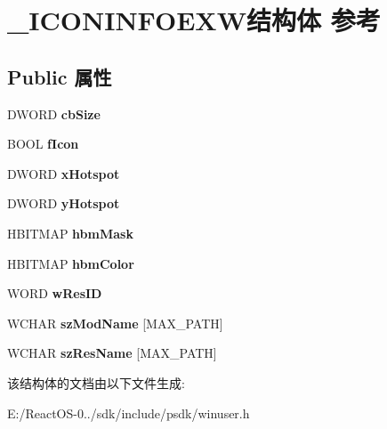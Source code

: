 \hypertarget{struct___i_c_o_n_i_n_f_o_e_x_w}{}\section{\+\_\+\+I\+C\+O\+N\+I\+N\+F\+O\+E\+X\+W结构体 参考}
\label{struct___i_c_o_n_i_n_f_o_e_x_w}
\subsection*{Public 属性}
\begin{DoxyCompactItemize}
\item 
\mbox{\label{struct___i_c_o_n_i_n_f_o_e_x_w_a4202eb53e8642f770f4d5baed3032496}} 
D\+W\+O\+RD {\bfseries cb\+Size}
\item 
\mbox{\label{struct___i_c_o_n_i_n_f_o_e_x_w_aa5603665c8ac4af2f0b5709dab7af674}} 
B\+O\+OL {\bfseries f\+Icon}
\item 
\mbox{\label{struct___i_c_o_n_i_n_f_o_e_x_w_a0a91b12b072897011c8b254a799de62e}} 
D\+W\+O\+RD {\bfseries x\+Hotspot}
\item 
\mbox{\label{struct___i_c_o_n_i_n_f_o_e_x_w_a934b4baf2380f6187fb4c9151dc472a1}} 
D\+W\+O\+RD {\bfseries y\+Hotspot}
\item 
\mbox{\label{struct___i_c_o_n_i_n_f_o_e_x_w_af23cc4a08c0e92194b45869b10efebe0}} 
H\+B\+I\+T\+M\+AP {\bfseries hbm\+Mask}
\item 
\mbox{\label{struct___i_c_o_n_i_n_f_o_e_x_w_ab54eccf143e8f97ec9a04a3325bc34c1}} 
H\+B\+I\+T\+M\+AP {\bfseries hbm\+Color}
\item 
\mbox{\label{struct___i_c_o_n_i_n_f_o_e_x_w_a6816db7be9a7fe0073675b38bbaebf98}} 
W\+O\+RD {\bfseries w\+Res\+ID}
\item 
\mbox{\label{struct___i_c_o_n_i_n_f_o_e_x_w_a4bdc512a82c7f86c961d9cb669addaba}} 
W\+C\+H\+AR {\bfseries sz\+Mod\+Name} \mbox{[}M\+A\+X\+\_\+\+P\+A\+TH\mbox{]}
\item 
\mbox{\label{struct___i_c_o_n_i_n_f_o_e_x_w_aeb21c8d130070e9e4d4b1af8624f7054}} 
W\+C\+H\+AR {\bfseries sz\+Res\+Name} \mbox{[}M\+A\+X\+\_\+\+P\+A\+TH\mbox{]}
\end{DoxyCompactItemize}


该结构体的文档由以下文件生成\+:\begin{DoxyCompactItemize}
\item 
E\+:/\+React\+O\+S-\/0../sdk/include/psdk/winuser.\+h\end{DoxyCompactItemize}
